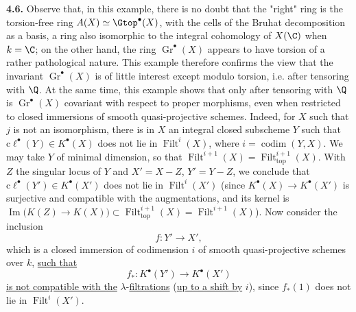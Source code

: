 \textbf{4.6.} Observe that, in this example, there is no doubt that the "right" ring is the torsion-free ring $A(X)\simeq\Gtop^\bullet(X)$, with the cells of the Bruhat decomposition as a basis, a ring also isomorphic to the integral cohomology of $X(\C)$ when $k=\C$; on the other hand, the ring $\operatorname{Gr}^\bullet(X)$ appears to have torsion of a rather pathological nature. This example therefore confirms the view that the invariant $\operatorname{Gr}^\bullet(X)$ is of little
%
interest except modulo torsion, i.e. after tensoring with $\Q$. At the same time, this example shows that only after tensoring with $\Q$ is $\operatorname{Gr}^\bullet(X)$ covariant with respect to proper morphisms, even when restricted to closed immersions of smooth quasi-projective schemes. Indeed, for $X$ such that $j$ is not an isomorphism, there is in $X$ an integral closed subscheme $Y$ such that $\mathrm{c}\ell^\bullet(Y)\in K^\bullet(X)$ does not lie in $\operatorname{Filt}^i(X)$, where $i=\operatorname{codim}(Y,X)$. We may take $Y$ of minimal dimension, so that $\operatorname{Filt}^{i+1}(X)=\operatorname{Filt}_{\mathrm{top}}^{i+1}(X)$. With $Z$ the singular locus of $Y$ and $X'=X-Z$, $Y'=Y-Z$, we conclude that $\mathrm{c}\ell^\bullet(Y')\in K^\bullet(X')$ does not lie in $\operatorname{Filt}^i(X')$ (since $K^\bullet(X)\to K^\bullet(X')$ is surjective and compatible with the augmentations, and its kernel is $\operatorname{Im}\bigl(K(Z)\longrightarrow K(X)\bigr)\subset\operatorname{Filt}_{\mathrm{top}}^{i+1}(X)=\operatorname{Filt}^{i+1}(X)$). Now consider the inclusion
\[
 f:Y'\longrightarrow X',
\]
which is a closed immersion of codimension $i$ of smooth quasi-projective schemes over $k$, \uline{such that}
\[
 f_*:K^\bullet(Y')\longrightarrow K^\bullet(X')
\]
\uline{is not compatible with the} $\lambda$-\uline{filtrations} (\uline{up to a shift by} $i$), since $f_*(1)$ does not lie in $\operatorname{Filt}^i(X')$.

